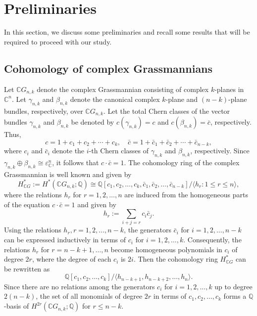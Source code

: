 \documentclass{amsart}
\begin{document}
	\section{Preliminaries}  \label{section 2}
	In this section, we discuss some preliminaries and recall some results that will be required to proceed with our study.
	
	\subsection{Cohomology of complex Grassmannians}
	Let $\mathbb{C}G_{n,k}$ denote the complex Grassmannian consisting of complex $k$-planes in $\mathbb{C}^n$. 
	Let $\gamma_{n,k}$ and $\beta_{n,k}$ denote the canonical complex $k$-plane and $(n-k)$-plane bundles, respectively, over $\mathbb{C}G_{n,k}$.
	Let the total Chern classes of the vector bundles $\gamma_{n,k}$ and $\beta_{n,k}$ be denoted by $c(\gamma_{n,k}) = c$ and $c(\beta_{n,k}) = \bar{c}$, respectively. Thus,
	$$c = 1 + c_1 + c_2 + \cdots + c_k, \quad \bar{c} = 1 + \bar{c}_1 + \bar{c}_2 + \cdots + \bar{c}_{n-k},$$
	where $c_i$ and $\bar{c}_i$ denote the $i$-th Chern classes of $\gamma_{n,k}$ and $\beta_{n,k}$, respectively.
	Since $\gamma_{n,k} \oplus \beta_{n,k} \cong \varepsilon_{\mathbb{C}}^n$, it follows that  $c \cdot \bar{c} = 1$.
	The  cohomology ring of the complex Grassmannian is well known and given by  
	$$
	H^*_{\mathbb{C}G}:=H^*(\mathbb{C}G_{n,k};\mathbb{Q}) \cong \mathbb{Q}[c_1, c_2, \dots, c_k, \bar{c}_1, \bar{c}_2, \dots, \bar{c}_{n-k}]/\langle h_r: 1\leq r\leq n\rangle,$$  
	where  the relations $h_r$ for $r = 1, 2, \dots, n$ are induced from the homogeneous parts of the equation $c\cdot \bar c=1$ and given by  
	\[
	h_r := \sum_{i+j=r} c_i \bar{c}_j.
	\]  
	Using the relations $h_r, r=1,2,...,n-k$, the generators $\bar{c}_i$ for $i = 1, 2, \dots, n-k$ can be expressed inductively in terms of $c_i$ for $i = 1, 2, \dots, k$.  Consequently, the relations $h_r$ for $r = n-k+1, \dots, n$ become homogeneous polynomials in $c_i$ of degree $2r$, where the degree of each $c_i$ is $2i$. Then the cohomology ring $H^*_{\mathbb{C}G}$ can be rewritten as  
	\begin{equation}\label{cohomo of grass}
		\mathbb{Q}[c_1, c_2, \dots, c_k]/\langle h_{n-k+1}, h_{n-k+2}, \dots, h_n \rangle.
	\end{equation}
	Since there are no relations among the generators $c_i$ for $i = 1, 2, \dots, k$ up to degree $2(n-k)$, the set of all monomials of degree $2r$ in terms of $c_1, c_2, \ldots, c_k$ forms a $\mathbb{Q}$-basis of $H^{2r}(\mathbb{C}G_{n,k};\mathbb{Q})$ for $r \leq n-k$.
	
\end{document}
